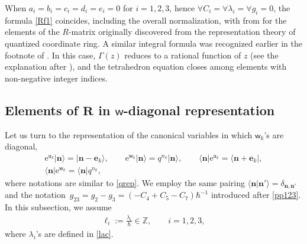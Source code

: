 \documentclass[pdftex]{sigma}
\newcommand{\Z}{{\mathbb Z}}
\newcommand{\e}{{\mathrm e}}
\newcommand{\uu}{{\mathsf u}}
\newcommand{\ww}{{\mathsf w}}
\numberwithin{equation}{section}
\begin{document}
\begin{Remark}\label{re:R}
 When $a_i=b_i=c_i=d_i=e_i=0$ for $i=1,2,3$, hence
 $\forall C_i = \forall\lambda_i=\forall g_i=0$, the formula
 \eqref{Rf1} coincides, including the overall normalization, with
  from \cite[equation~(3.81)]{K22} for
 the elements of the $R$-matrix \cite{KV94} originally discovered
 from the representation theory of quantized coordinate ring. A
 similar integral formula was recognized earlier in the footnote of
 \cite[p.\ 5]{BS06}. In this case, $\Gamma(z)$ reduces to a rational
 function of $z$ (see the explanation after \cite[equation~(3.81)]{K22}),
 and the tetrahedron equation closes among elements with non-negative
 integer indices.
\end{Remark}

\subsection[Elements of R in w-diagonal representation]{Elements of $\boldsymbol{R}$ in $\boldsymbol{\ww}$-diagonal representation}\label{ss:wd}

Let us turn to the representation of the canonical variables in which $\ww_k$'s are diagonal,
\begin{gather}
\e^{\uu_k}|\mathbf{n}\rangle = |\mathbf{n} - \mathbf{e}_k\rangle,
\qquad
\e^{\ww_k}|\mathbf{n}\rangle = q^{n_k}|\mathbf{n}\rangle,
\qquad
\langle \mathbf{n}|\e^{\uu_k}=\langle \mathbf{n} + \mathbf{e}_k|,\nonumber
\\
\langle \mathbf{n}|\e^{\ww_k} = \langle \mathbf{n}|q^{n_k},\label{wrep}
\end{gather}
where notations are similar to \eqref{qrep}.
We employ the same pairing $\langle \mathbf{n}|\mathbf{n}'\rangle = \delta_{\mathbf{n}, \mathbf{n}'}$ and the
notation~${g_{23}=g_2-g_3 = (-C_4+C_5-C_7)\hbar^{-1}}$ introduced after \eqref{pp123}.
In this subsection, we assume
\begin{align}\label{els}
\ell_i := \frac{\lambda_i}{\hbar} \in \Z,\qquad i=1,2,3,
\end{align}
where $\lambda_i$'s are defined in \eqref{lac}.
\end{document}
